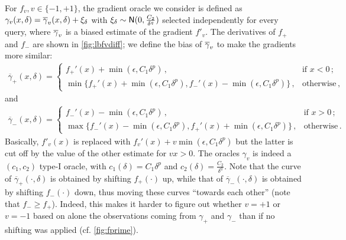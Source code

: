 For $f_v, v\in\{-1,+1\}$, the gradient oracle we consider is defined as $\gamma_v(x,\delta)=\overline{\gamma}_v(x,\delta)+\xi_\delta$ with $\xi_\delta \sim \mathsf{N}(0,\frac{C_2}{\delta^q})$ selected independently for every query, where $\overline{\gamma}_v$ is a biased estimate of the gradient $f'_v$. The derivatives of $f_+$ and $f_-$ are shown in \cref{fig:lbfvdiff}; we define the bias of $\overline{\gamma}_v$ to make the gradients more similar:
\begin{align*}
\overline{\gamma}_+(x,\delta) = 
	\begin{cases}
	f_+'(x) + \min(\epsilon,C_1\delta^p)\,, & \text{if } x<0\,; \\
	\min\big\{f_+'(x) + \min(\epsilon,C_1\delta^p), f_-'(x) - \min(\epsilon,C_1\delta^p)\big\}\,, & \text{otherwise}\,,
	\end{cases}
\end{align*}
and
\begin{align*}
\overline{\gamma}_-(x,\delta) = 
	\begin{cases}
	f_-'(x) - \min(\epsilon,C_1\delta^p)\,, & \text{if } x>0\,; \\
	\max\big\{f_-'(x) - \min(\epsilon,C_1\delta^p), f_+'(x) + \min(\epsilon,C_1\delta^p)\big\}\,, & \text{otherwise}\,.
	\end{cases}
\end{align*}
Basically, $f'_v(x)$ is replaced with $f_v'(x) + v \min(\epsilon,C_1\delta^p)$ but the latter is cut off by the value of the other estimate for $vx>0$.
The oracles $\gamma_v$ is indeed a $(c_1,c_2)$ type-I oracle, with $c_1(\delta)=C_1\delta^p$ and $c_2(\delta)=\frac{C_2}{\delta^q}$.
Note that the curve of $\overline{\gamma}_+(\cdot,\delta)$ is obtained by shifting $f_+(\cdot)$ up,
while that of $\overline{\gamma}_-(\cdot,\delta)$ is obtained by shifting $f_-(\cdot)$ down, 
thus moving these curves ``towards each other'' (note that $f_-\ge f_+$).
Indeed, this makes it harder to figure out whether $v=+1$ or $v=-1$ based on alone
the observations coming from $\gamma_+$ and $\gamma_-$ than if no shifting was applied (cf. \cref{fig:fprime}).

